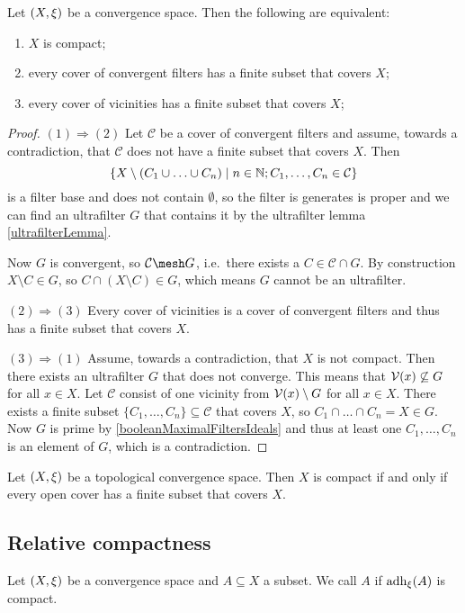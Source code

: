 \begin{proposition}
Let $\left( X,\xi \right)$ be a convergence space. Then the following are equivalent:
\begin{enumerate}
\item $X$ is compact;
\item every cover of convergent filters has a finite subset that covers $X$;
\item every cover of vicinities has a finite subset that covers $X$;
\end{enumerate}
\end{proposition}
\begin{proof}
$(1) \Rightarrow (2)$ Let $\mathcal{C}$ be a cover of convergent filters and assume, towards a contradiction, that $\mathcal{C}$ does not have a finite subset that covers $X$. Then
\[ \left\{ X\setminus(C_1\cup \ldots \cup C_n) \;\middle|\; n\in \mathbb{N}; C_1,\ldots, C_n \in \mathcal{C} \right\} \]
is a filter base and does not contain $\emptyset$, so the filter is generates is proper and we can find an ultrafilter $G$ that contains it by the ultrafilter lemma \ref{ultrafilterLemma}.

Now $G$ is convergent, so $\mathcal{C}\mesh G$, i.e.\ there exists a $C\in \mathcal{C}\cap G$. By construction $X\setminus C\in G$, so $C\cap (X\setminus C)\in G$, which means $G$ cannot be an ultrafilter.

$(2) \Rightarrow (3)$ Every cover of vicinities is a cover of convergent filters and thus has a finite subset that covers $X$.

$(3) \Rightarrow (1)$ Assume, towards a contradiction, that $X$ is not compact. Then there exists an ultrafilter $G$ that does not converge. This means that $\operatorname{\mathcal{V}}(x) \not\subseteq G$ for all $x\in X$. Let $\mathcal{C}$ consist of one vicinity from $\operatorname{\mathcal{V}}(x)\setminus G$ for all $x\in X$. There exists a finite subset $\{C_1, \ldots, C_n\}\subseteq \mathcal{C}$ that covers $X$, so $C_1\cap \ldots \cap C_n = X \in G$. Now $G$ is prime by \ref{booleanMaximalFiltersIdeals} and thus at least one $C_1, \ldots, C_n$ is an element of $G$, which is a contradiction.
\end{proof}
\begin{corollary} \label{topologyCompactnessOpenCover}
Let $\left( X,\xi \right)$ be a topological convergence space. Then $X$ is compact \textup{if and only if} every open cover has a finite subset that covers $X$.
\end{corollary}

\subsection{Relative compactness}
\begin{definition}
Let $\left( X,\xi \right)$ be a convergence space and $A\subseteq X$ a subset. We call $A$  if $\operatorname{adh}_\xi(A)$ is compact.
\end{definition}

